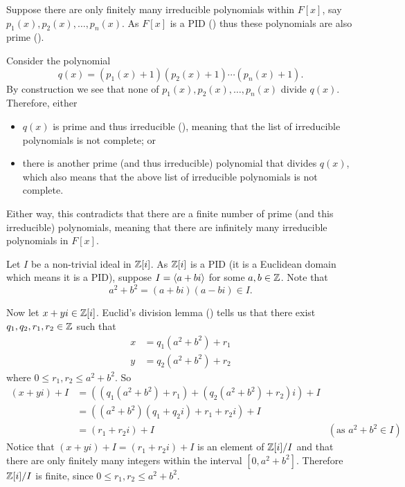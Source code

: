 \begin{questions}
    \item Suppose there are only finitely many irreducible polynomials within $F[x]$, say $p_1(x), p_2(x), \dots, p_n(x)$. As $F[x]$ is a PID () thus these polynomials are also prime ().

    Consider the polynomial
    \[
        q(x) = (p_1(x) + 1)(p_2(x) + 1)\cdots(p_n(x) + 1).
    \]
    By construction we see that none of $p_1(x), p_2(x), \dots, p_n(x)$ divide $q(x)$. Therefore, either
    \begin{itemize}
        \item $q(x)$ is prime and thus irreducible (), meaning that the list of irreducible polynomials is not complete; or
        \item there is another prime (and thus irreducible) polynomial that divides $q(x)$, which also means that the above list of irreducible polynomials is not complete.
    \end{itemize}
    Either way, this contradicts that there are a finite number of prime (and this irreducible) polynomials, meaning that there are infinitely many irreducible polynomials in $F[x]$.

    \item Let $I$ be a non-trivial ideal in $\mathbb{Z}[i]$. As $\mathbb{Z}[i]$ is a PID (it is a Euclidean domain which means it is a PID), suppose $I = \left\langle a+bi\right\rangle$ for some $a,b \in \mathbb{Z}$. Note that
    \[
        a^2 + b^2 = (a+bi)(a-bi) \in I.
    \]

    Now let $x+yi \in \mathbb{Z}[i]$. Euclid's division lemma () tells us that there exist $q_1, q_2, r_1, r_2 \in \mathbb{Z}$ such that
    \begin{align*}
        x &= q_1(a^2+b^2) + r_1\\
        y &= q_2(a^2+b^2) + r_2
    \end{align*}
    where $0 \leq r_1, r_2 \leq a^2+b^2$. So
    \begin{align*}
        (x+yi)+I &= \left(\left(q_1(a^2+b^2) + r_1\right) + \left(q_2(a^2+b^2) + r_2\right)i\right) + I\\
        &= \left((a^2+b^2)(q_1+q_2i) + r_1 + r_2i\right) + I\\
        &= (r_1 + r_2i) + I & (\text{as } a^2+b^2 \in I)
    \end{align*}
    Notice that $(x+yi)+I = (r_1+r_2i)+I$ is an element of $\mathbb{Z}[i]/I$ and that there are only finitely many integers within the interval $[0, a^2+b^2]$. Therefore $\mathbb{Z}[i]/I$ is finite, since $0 \leq r_1, r_2 \leq a^2+b^2$.


\end{questions}

